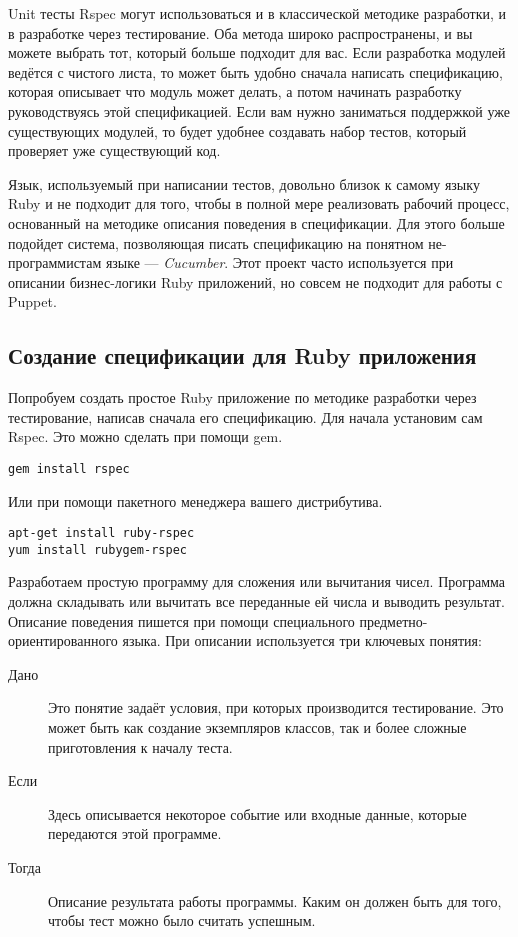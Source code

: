 Unit тесты Rspec могут использоваться и в классической методике разработки, и в разработке через тестирование. Оба метода широко распространены, и вы можете выбрать тот, который больше подходит для вас. Если разработка модулей ведётся с чистого листа, то может быть удобно сначала написать спецификацию, которая описывает что модуль может делать, а потом начинать разработку руководствуясь этой спецификацией. Если вам нужно заниматься поддержкой уже существующих модулей, то будет удобнее создавать набор тестов, который проверяет уже существующий код.

Язык, используемый при написании тестов, довольно близок к самому языку Ruby и не подходит для того, чтобы в полной мере реализовать рабочий процесс, основанный на методике описания поведения в спецификации. Для этого больше подойдет система, позволяющая писать спецификацию на понятном не-программистам языке --- \emph{Cucumber}. Этот проект часто используется при описании бизнес-логики Ruby приложений, но совсем не подходит для работы с Puppet.

\subsection{Создание спецификации для Ruby приложения}

Попробуем создать простое Ruby приложение по методике разработки через тестирование, написав сначала его спецификацию. Для начала установим сам Rspec. Это можно сделать при помощи gem.

\begin{verbatim}
gem install rspec
\end{verbatim}

Или при помощи пакетного менеджера вашего дистрибутива.

\begin{verbatim}
apt-get install ruby-rspec
yum install rubygem-rspec
\end{verbatim}

Разработаем простую программу для сложения или вычитания чисел. Программа должна складывать или вычитать все переданные ей числа и выводить результат. Описание поведения пишется при помощи специального предметно-ориентированного языка. При описании используется три ключевых понятия:

\begin{description}
\item[Дано]
Это понятие задаёт условия, при которых производится тестирование. Это может быть как создание экземпляров классов, так и более сложные приготовления к началу теста.
\item[Если] 
Здесь описывается некоторое событие или входные данные, которые передаются этой программе.
\item[Тогда]
Описание результата работы программы. Каким он должен быть для того, чтобы тест можно было считать успешным.
\end{description}

